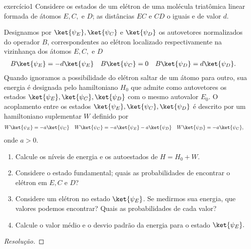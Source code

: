 \begin{exercício}{}{exercício1}
    Considere os estados de um elétron de uma molécula triatômica linear formada de átomos \(E, C, \) e \(D\); as distâncias \(EC\) e \(CD\) o iguais e de valor \(d\).
    \begin{center}
    \end{center}
    Designamos por \(\ket{\psi_E}, \ket{\psi_C}\) e \(\ket{\psi_D}\) os autovetores normalizados do operador \(B\), correspondentes ao elétron localizado respectivamente na vizinhança dos átomos \(E, C,\) e \(D\)
    \begin{align*}
        B\ket{\psi_E} &= - d\ket{\psi_E}&
        B\ket{\psi_C} &= 0&
        B\ket{\psi_D} &= d\ket{\psi_D}.
    \end{align*}
    Quando ignoramos a possibilidade do elétron saltar de um átomo para outro, sua energia é designada pelo hamiltoniano \(H_0\) que admite como autovetores os estados \(\ket{\psi_E}, \ket{\psi_C}, \ket{\psi_D}\) com o mesmo autovalor \(E_0\). O acoplamento entre os estados \(\ket{\psi_E}, \ket{\psi_C}, \ket{\psi_D}\) é descrito por um hamiltoniano suplementar \(W\) definido por
    \begin{align*}
        W \ket{\psi_E} &= -a \ket{\psi_C}&
        W \ket{\psi_C} &= -a \ket{\psi_E} - a \ket{\psi_D}&
        W \ket{\psi_D} &= -a \ket{\psi_C},
    \end{align*}
    onde \(a > 0\).
    \begin{enumerate}[label=(\alph*)]
        \item Calcule os níveis de energia e os autoestados de \(H = H_0 + W\).
        \item Considere o estado fundamental; quais as probabilidades de encontrar o elétron em \(E, C\) e \(D\)?
        \item Considere um elétron no estado \(\ket{\psi_E}\). Se medirmos sua energia, que valores podemos encontrar? Quais as probabilidades de cada valor?
        \item Calcule o valor médio e o desvio padrão da energia para o estado \(\ket{\psi_E}.\)
    \end{enumerate}
\end{exercício}
\begin{proof}[Resolução]

\end{proof}
